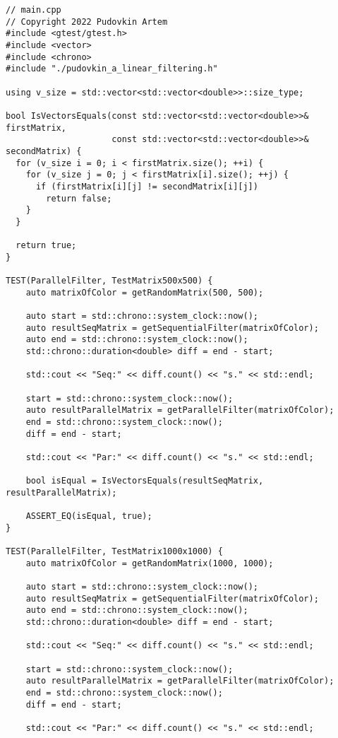 \documentclass{report}
\begin{document}
\begin{lstlisting}
// main.cpp
// Copyright 2022 Pudovkin Artem
#include <gtest/gtest.h>
#include <vector>
#include <chrono>
#include "./pudovkin_a_linear_filtering.h"

using v_size = std::vector<std::vector<double>>::size_type;

bool IsVectorsEquals(const std::vector<std::vector<double>>& firstMatrix,
                     const std::vector<std::vector<double>>& secondMatrix) {
  for (v_size i = 0; i < firstMatrix.size(); ++i) {
    for (v_size j = 0; j < firstMatrix[i].size(); ++j) {
      if (firstMatrix[i][j] != secondMatrix[i][j])
        return false;
    }
  }

  return true;
}

TEST(ParallelFilter, TestMatrix500x500) {
    auto matrixOfColor = getRandomMatrix(500, 500);

    auto start = std::chrono::system_clock::now();
    auto resultSeqMatrix = getSequentialFilter(matrixOfColor);
    auto end = std::chrono::system_clock::now();
    std::chrono::duration<double> diff = end - start;

    std::cout << "Seq:" << diff.count() << "s." << std::endl;

    start = std::chrono::system_clock::now();
    auto resultParallelMatrix = getParallelFilter(matrixOfColor);
    end = std::chrono::system_clock::now();
    diff = end - start;

    std::cout << "Par:" << diff.count() << "s." << std::endl;

    bool isEqual = IsVectorsEquals(resultSeqMatrix, resultParallelMatrix);

    ASSERT_EQ(isEqual, true);
}

TEST(ParallelFilter, TestMatrix1000x1000) {
    auto matrixOfColor = getRandomMatrix(1000, 1000);

    auto start = std::chrono::system_clock::now();
    auto resultSeqMatrix = getSequentialFilter(matrixOfColor);
    auto end = std::chrono::system_clock::now();
    std::chrono::duration<double> diff = end - start;

    std::cout << "Seq:" << diff.count() << "s." << std::endl;

    start = std::chrono::system_clock::now();
    auto resultParallelMatrix = getParallelFilter(matrixOfColor);
    end = std::chrono::system_clock::now();
    diff = end - start;

    std::cout << "Par:" << diff.count() << "s." << std::endl;


\end{lstlisting}
\end{document}
